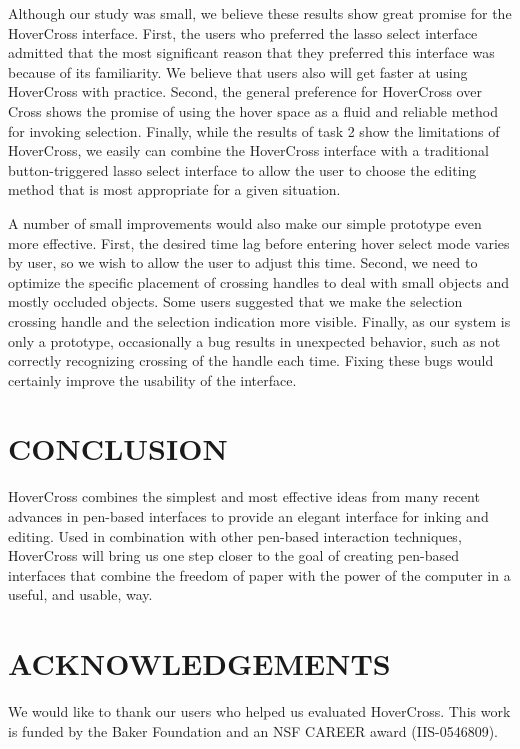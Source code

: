 \documentclass{article}
\begin{document}
Although our study was small, we believe these results show great
promise for the HoverCross interface.  First, the users who preferred
the lasso select interface admitted that the most significant reason
that they preferred this interface was because of its familiarity.  We
believe that users also will get faster at using HoverCross with
practice.  Second, the general preference for HoverCross over Cross
shows the promise of using the hover space as a fluid and reliable
method for invoking selection.  Finally, while the results of task 2
show the limitations of HoverCross, we easily can combine the
HoverCross interface with a traditional button-triggered lasso select
interface to allow the user to choose the editing method that is most
appropriate for a given situation.

A number of small improvements would also make our simple prototype
even more effective.  First, the desired time lag before entering
hover select mode varies by user, so we wish to allow the user to
adjust this time.  Second, we need to optimize the specific placement
of crossing handles to deal with small objects and mostly occluded
objects.  Some users suggested that we make the selection crossing
handle and the selection indication more visible.  Finally, as our
system is only a prototype, occasionally a bug results in unexpected
behavior, such as not correctly recognizing crossing of the handle
each time.  Fixing these bugs would certainly improve the usability of
the interface.

\section{CONCLUSION}
HoverCross combines the simplest and most effective ideas from many
recent advances in pen-based interfaces to provide an elegant
interface for inking and editing.  Used in combination with other
pen-based interaction techniques, HoverCross will bring us one step
closer to the goal of creating pen-based interfaces that combine the
freedom of paper with the power of the computer in a useful, and
usable, way.  


\section{ACKNOWLEDGEMENTS}
We would like to thank our users who helped us evaluated HoverCross.
This work is funded by the Baker Foundation and an NSF CAREER award
(IIS-0546809).


\end{document}
